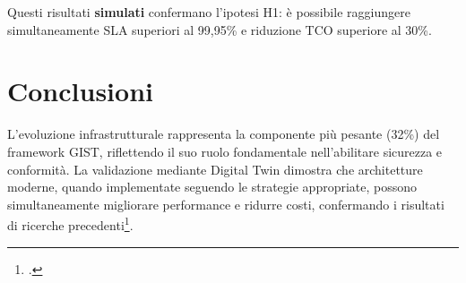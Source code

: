 Questi risultati \textbf{simulati} confermano l'ipotesi H1: è possibile raggiungere simultaneamente SLA superiori al 99,95\% e riduzione TCO superiore al 30\%.

\section{Conclusioni}

L'evoluzione infrastrutturale rappresenta la componente più pesante (32\%) del framework GIST, riflettendo il suo ruolo fondamentale nell'abilitare sicurezza e conformità. La validazione mediante Digital Twin dimostra che architetture moderne, quando implementate seguendo le strategie appropriate, possono simultaneamente migliorare performance e ridurre costi, confermando i risultati di ricerche precedenti\footcite{groupib2024}.

\clearpage
\printbibliography[
    heading=subbibliography,
    title={Riferimenti Bibliografici del Capitolo 3},
]